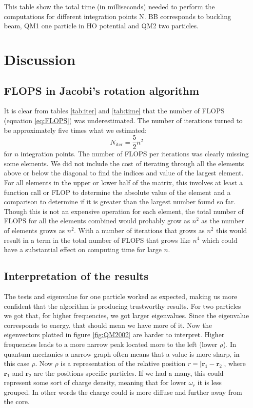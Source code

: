\documentclass[reprint,english,notitlepage,nofootinbib]{revtex4-1}  %
\begin{document}
\begin{table}[h]
	
	\label{tab:time}
	\caption{This table show the total time (in milliseconds) needed to perform the computations for different integration points N. BB corresponds to buckling beam, QM1 one particle in HO potential and QM2 two particles.}
\end{table}

\section{Discussion}

\subsection{FLOPS in Jacobi's rotation algorithm}

It is clear from tables \ref{tab:iter} and \ref{tab:time} that the number of FLOPS (equation \ref{eq:FLOPS}) was underestimated. The number of iterations turned to be approximately five times what we estimated:
\begin{equation*}
  N_{\text{iter}} = \frac{5}{2}n^2
\end{equation*}
for $n$ integration points. The number of FLOPS per iterations was clearly missing some elements. We did not include the cost of iterating through all the elements above or below the diagonal to find the indices and value of the largest element. For all elements in the upper or lower half of the matrix, this involves at least a function call or FLOP to determine the absolute value of the element and a comparison to determine if it is greater than the largest number found so far. Though this is not an expensive operation for each element, the total number of FLOPS for all the elements combined would probably grow as $n^2$ as the number of elements grows as $n^2$. With a number of iterations that grows as $n^2$ this would result in a term in the total number of FLOPS that grows like $n^4$ which could have a substantial effect on computing time for large $n$.

\subsection{Interpretation of the results}

The tests and eigenvalue for one particle worked as expected, making us more confident that the algorithm is producing trustworthy results. For two particles we got that, for higher frequencies, we got larger eigenvalues. Since the eigenvalue corresponds to energy, that should mean we have more of it. Now the eigenvectors plotted in figure \ref{fig:QM2002} are harder to interpret. Higher frequencies leads to a more narrow peak located more to the left (lower $\rho$). In quantum mechanics a narrow graph often means that a value is more sharp, in this case $\rho$. Now $\rho$ is a representation of the relative position $r = |\mathbf{r}_1 - \mathbf{r}_2|$, where $\mathbf{r}_1$ and $\mathbf{r}_2$ are the positions specific particles. If we had a many, this could represent some sort of charge density, meaning that for lower $\omega_r$ it is less grouped. In other words the charge could is more diffuse and further away from the core. 
\end{document}
